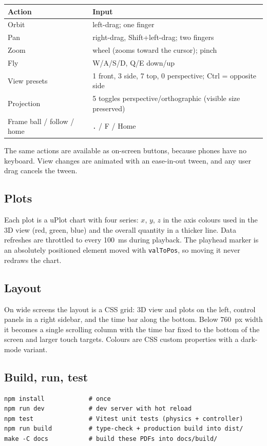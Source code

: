 \documentclass[11pt]{article}
\begin{document}
\begin{center}
\begin{tabular}{@{}ll@{}}
\toprule
Action & Input \\ \midrule
Orbit & left-drag; one finger \\
Pan & right-drag, Shift+left-drag; two fingers \\
Zoom & wheel (zooms toward the cursor); pinch \\
Fly & W/A/S/D, Q/E down/up \\
View presets & 1 front, 3 side, 7 top, 0 perspective; Ctrl = opposite side \\
Projection & 5 toggles perspective/orthographic (visible size preserved) \\
Frame ball / follow / home & \texttt{.} / F / Home \\ \bottomrule
\end{tabular}
\end{center}
The same actions are available as on-screen buttons, because phones have no keyboard. View
changes are animated with an ease-in-out tween, and any user drag cancels the tween.

\subsection{Plots}
Each plot is a uPlot chart with four series: $x$, $y$, $z$ in the axis colours used in the 3D
view (red, green, blue) and the overall quantity in a thicker line. Data refreshes are
throttled to every \SI{100}{ms} during playback. The playhead marker is an absolutely positioned
element moved with \texttt{valToPos}, so moving it never redraws the chart.

\subsection{Layout}
On wide screens the layout is a CSS grid: 3D view and plots on the left, control panels in
a right sidebar, and the time bar along the bottom. Below \SI{760}{px} width it becomes a single
scrolling column with the time bar fixed to the bottom of the screen and larger touch targets.
Colours are CSS custom properties with a dark-mode variant.

\subsection{Build, run, test}
\begin{lstlisting}
npm install            # once
npm run dev            # dev server with hot reload
npm test               # Vitest unit tests (physics + controller)
npm run build          # type-check + production build into dist/
make -C docs           # build these PDFs into docs/build/
\end{lstlisting}
\end{document}
